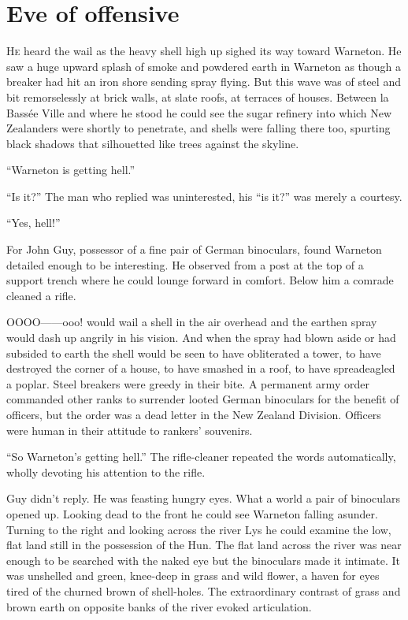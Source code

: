 \chapter*{\textsf{Eve of offensive}}

H\textsc{e} heard the wail as the heavy shell high up sighed its way toward Warneton. He saw a huge upward splash of smoke and powdered earth in Warneton as though a breaker had hit an iron shore sending spray flying. But this wave was of steel and bit remorselessly at brick walls, at slate roofs, at terraces of houses. Between la Bass\'{e}e Ville and where he stood he could see the sugar refinery into which New Zealanders were shortly to penetrate, and shells were falling there too, spurting black shadows that silhouetted like trees against the skyline.

``Warneton is getting hell.''

``Is it?'' The man who replied was uninterested, his ``is it?'' was merely a courtesy.

``Yes, hell!''

For John Guy, possessor of a fine pair of German binoculars, found Warneton detailed enough to be interesting. He observed from a post at the top of a support trench where he could lounge forward in comfort. Below him a comrade cleaned a rifle.

OOOO------ooo! would wail a shell in the air overhead and the earthen spray would dash up angrily in his vision. And when the spray had blown aside or had subsided to earth the shell would be seen to have obliterated a tower, to have destroyed the corner of a house, to have smashed in a roof, to have spreadeagled a poplar. Steel breakers were greedy in their bite. A permanent army order commanded other ranks to surrender looted German binoculars for the benefit of officers, but the order was a dead letter in the New Zealand Division. Officers were human in their attitude to rankers' souvenirs.

``So Warneton's getting hell.'' The rifle-cleaner repeated the words automatically, wholly devoting his attention to the rifle.

Guy didn't reply. He was feasting hungry eyes. What a world a pair of binoculars opened up. Looking dead to the front he could see Warneton falling asunder. Turning to the right and looking across the river Lys he could examine the low, flat land still in the possession of the Hun. The flat land across the river was near enough to be searched with the naked eye but the binoculars made it intimate. It was unshelled and green, knee-deep in grass and wild flower, a haven for eyes tired of the churned brown of shell-holes. The extraordinary contrast of grass and brown earth on opposite banks of the river evoked articulation.

